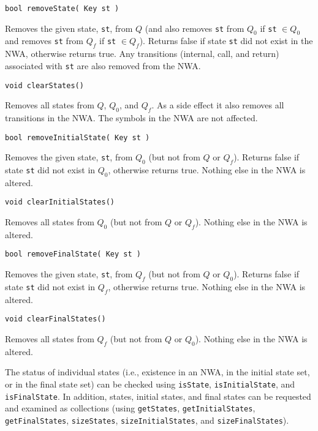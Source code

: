 \begin{description}

  \item\texttt{bool removeState( Key st )} \nopagebreak

    Removes the given state, \texttt{st}, from $Q$ (and also removes
    \texttt{st} from $Q_0$ if \texttt{st} $\in Q_0$ and removes \texttt{st}
    from $Q_f$ if \texttt{st} $\in Q_f$).  Returns false if state \texttt{st}
    did not exist in the NWA, otherwise returns true. 
    Any transitions (internal, call, and return)
    associated with \texttt{st} are also removed from the NWA.

  \item\texttt{void clearStates()} \nopagebreak

    Removes all states from $Q$, $Q_0$, and
    $Q_f$.  As a side effect it also removes all transitions in the NWA.  The
    symbols in the NWA are not affected.

  \item\texttt{bool removeInitialState( Key st )} \nopagebreak

    Removes the given state, \texttt{st}, from $Q_0$ (but not from $Q$ or
    $Q_f$).  Returns false if state \texttt{st} did not exist in $Q_0$,
    otherwise returns true.  Nothing else in the NWA is altered.

  \item\texttt{void clearInitialStates()} \nopagebreak

    Removes all states from $Q_0$ (but not from $Q$ or $Q_f$).  Nothing else
    in the NWA is altered.

  \item\texttt{bool removeFinalState( Key st )} \nopagebreak

    Removes the given state, \texttt{st}, from $Q_f$ (but not from $Q$ or
    $Q_0$).  Returns false if state \texttt{st} did not exist in $Q_f$,
    otherwise returns true.  Nothing else in the NWA is altered.

  \item\texttt{void clearFinalStates()} \nopagebreak

    Removes all states from $Q_f$ (but not from $Q$ or $Q_0$).  Nothing else
    in the NWA is altered. \\

\end{description}

The status of individual states (i.e., existence in an NWA, in the initial
state set, or in the final state set) can be checked
using \texttt{isState},
\texttt{isInitialState}, and \texttt{isFinalState}.  In addition, states,
initial states, and final states can be requested and examined as collections
(using \texttt{getStates}, \texttt{getInitialStates},
\texttt{getFinalStates}, \texttt{sizeStates},
\texttt{sizeInitialStates}, and \texttt{sizeFinalStates}). \\

